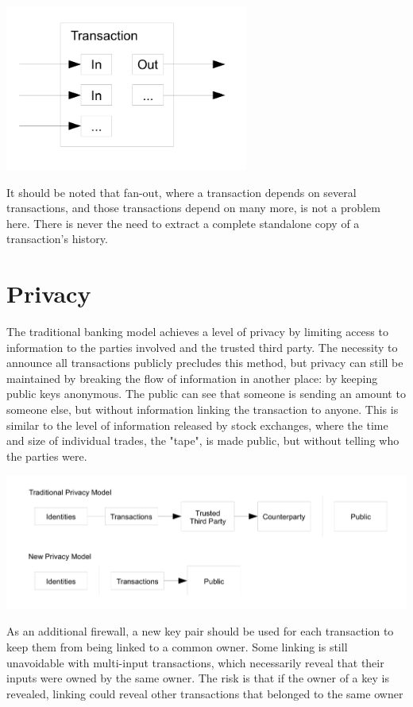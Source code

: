 \documentclass[10pt]{book}
\begin{document}
\begin{center}
\includegraphics[width=0.6\textwidth]{./images/5.png}
\end{center}

It should be noted that fan-out, where a transaction depends on several transactions, and those transactions depend on many more, is not a problem here.
There is never the need to extract a complete standalone copy of a transaction's history.

\chapter{Privacy}
The traditional banking model achieves a level of privacy by limiting access to information to the parties involved and the trusted third party.
The necessity to announce all transactions publicly precludes this method, but privacy can still be maintained by breaking the flow of information in another place: by keeping public keys anonymous.
The public can see that someone is sending an amount to someone else, but without information linking the transaction to anyone.
This is similar to the level of information released by stock exchanges, where the time and size of individual trades, the "tape", is made public, but without telling who the parties were.

\begin{center}
\includegraphics[width=1\textwidth]{./images/6.png}
\end{center}

As an additional firewall, a new key pair should be used for each transaction to keep them from being linked to a common owner.
Some linking is still unavoidable with multi-input transactions, which necessarily reveal that their inputs were owned by the same owner.
The risk is that if the owner of a key is revealed, linking could reveal other transactions that belonged to the same owner
\end{document}
